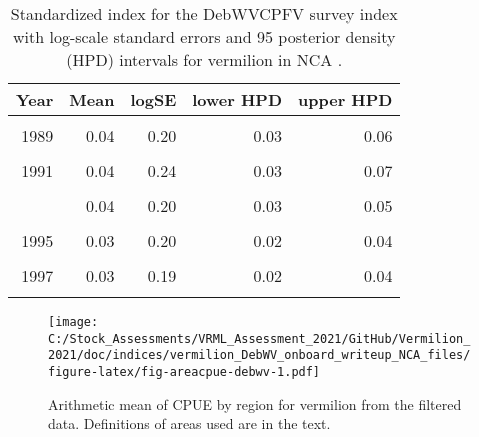 \documentclass[
]{article}
\begin{document}
\begin{table}

\caption{\label{tab:tab-index-debwv}Standardized index for the DebWVCPFV survey index with log-scale standard errors and 95%
       posterior density (HPD) intervals for vermilion in NCA .}
\centering
\begin{tabular}[t]{rrrrr}
\toprule
Year & Mean & logSE & lower HPD & upper HPD\\
\midrule
\cellcolor{gray!6}{1988} & \cellcolor{gray!6}{0.03} & \cellcolor{gray!6}{0.22} & \cellcolor{gray!6}{0.02} & \cellcolor{gray!6}{0.05}\\
1989 & 0.04 & 0.20 & 0.03 & 0.06\\
\cellcolor{gray!6}{1990} & \cellcolor{gray!6}{0.09} & \cellcolor{gray!6}{0.23} & \cellcolor{gray!6}{0.06} & \cellcolor{gray!6}{0.14}\\
1991 & 0.04 & 0.24 & 0.03 & 0.07\\
\cellcolor{gray!6}{1992} & \cellcolor{gray!6}{0.04} & \cellcolor{gray!6}{0.20} & \cellcolor{gray!6}{0.03} & \cellcolor{gray!6}{0.06}\\
\addlinespace
1993 & 0.04 & 0.20 & 0.03 & 0.05\\
\cellcolor{gray!6}{1994} & \cellcolor{gray!6}{0.03} & \cellcolor{gray!6}{0.20} & \cellcolor{gray!6}{0.02} & \cellcolor{gray!6}{0.05}\\
1995 & 0.03 & 0.20 & 0.02 & 0.04\\
\cellcolor{gray!6}{1996} & \cellcolor{gray!6}{0.02} & \cellcolor{gray!6}{0.21} & \cellcolor{gray!6}{0.01} & \cellcolor{gray!6}{0.03}\\
1997 & 0.03 & 0.19 & 0.02 & 0.04\\
\addlinespace
\cellcolor{gray!6}{1998} & \cellcolor{gray!6}{0.03} & \cellcolor{gray!6}{0.21} & \cellcolor{gray!6}{0.02} & \cellcolor{gray!6}{0.05}\\
\bottomrule
\end{tabular}
\end{table}

\FloatBarrier

\begin{figure}
\centering
\texttt{[image: C:/Stock\_Assessments/VRML\_Assessment\_2021/GitHub/Vermilion\_2021/doc/indices/vermilion\_DebWV\_onboard\_writeup\_NCA\_files/figure-latex/fig-areacpue-debwv-1.pdf]}
\caption{\label{fig:fig-areacpue-debwv}Arithmetic mean of CPUE by region for vermilion from the filtered data. Definitions of areas used are in the text.}
\end{figure}
\end{document}
